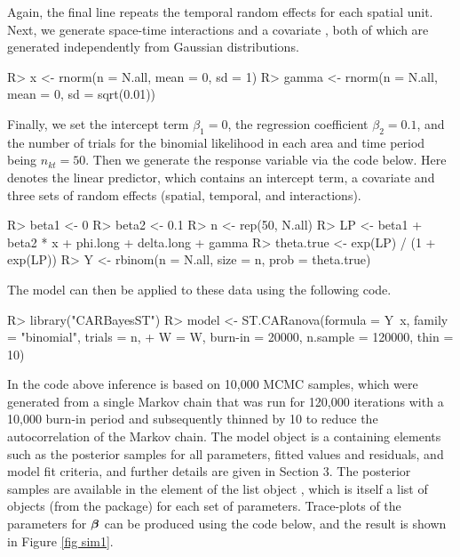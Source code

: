 \documentclass[article, nojss]{jss}
\newcommand{\bd}[1]{\ensuremath{\mbox{\boldmath $#1$}}}
\begin{document}
Again, the final line repeats the temporal random effects for each spatial unit. Next, we generate space-time interactions and a covariate , both of which are generated independently from Gaussian distributions.

\begin{Schunk}
\begin{Sinput}
R> x <- rnorm(n = N.all, mean = 0, sd = 1)
R> gamma <- rnorm(n = N.all, mean = 0, sd = sqrt(0.01))
\end{Sinput}
\end{Schunk}

Finally, we set the intercept term $\beta_1=0$, the regression coefficient $\beta_2=0.1$, and the number of trials for the binomial likelihood in each area and time period being $n_{kt}=50$. Then we generate the response variable via the code below. Here  denotes the linear predictor, which contains an intercept term, a covariate and three sets of random effects (spatial, temporal, and interactions).

\begin{Schunk}
\begin{Sinput}
R> beta1 <- 0
R> beta2 <- 0.1
R> n <- rep(50, N.all)
R> LP <- beta1 + beta2 * x + phi.long + delta.long + gamma
R> theta.true <- exp(LP) / (1 + exp(LP))
R> Y <- rbinom(n = N.all, size = n, prob = theta.true)
\end{Sinput}
\end{Schunk}


The  model can then be applied to these data using the following code.


\begin{CodeInput}
R> library("CARBayesST")
R> model <- ST.CARanova(formula = Y~x, family = "binomial", trials = n,  
+    W = W, burn-in = 20000, n.sample = 120000, thin = 10)
\end{CodeInput}

In the code above inference is based on 10,000 MCMC samples, which were generated from a single Markov chain that was run for 120,000 iterations with a 10,000 burn-in period and subsequently thinned by 10 to reduce the autocorrelation of the Markov chain. The model object is a  containing elements such as the posterior samples for all parameters, fitted values and residuals, and model fit criteria, and further details are given in Section 3. The posterior samples are available in the  element of the list object , which is itself a list of  objects (from the  package) for each set of parameters. Trace-plots of the parameters for $\bd{\beta}$ can be produced using the code below, and the result is shown in Figure \ref{fig sim1}.
\end{document}
